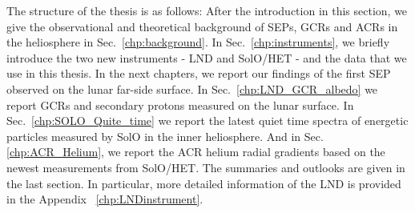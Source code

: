 The structure of the thesis is as follows: After the introduction in this section, we give the observational and theoretical background of \acp{SEP}, \acp{GCR} and \acp{ACR} in the heliosphere in Sec.~\ref{chp:background}. In Sec.~\ref{chp:instruments}, we briefly introduce the two new instruments - \ac{LND} and \ac{SolO}/\ac{HET} - and the data that we use in this thesis. In the next chapters, we report our findings of the first \ac{SEP} observed on the lunar far-side surface. In Sec.~\ref{chp:LND_GCR_albedo} we report \acp{GCR} and secondary protons measured on the lunar surface. In Sec.~\ref{chp:SOLO_Quite_time} we report the latest quiet time spectra of energetic particles measured by \ac{SolO} in the inner heliosphere. And in Sec.\ref{chp:ACR_Helium}, we report the \ac{ACR} helium radial gradients based on the newest measurements from \ac{SolO}/\ac{HET}. The summaries and outlooks are given in the last section.
In particular, more detailed information of the \ac{LND} is provided in the Appendix ~\ref{chp:LNDinstrument}.

















